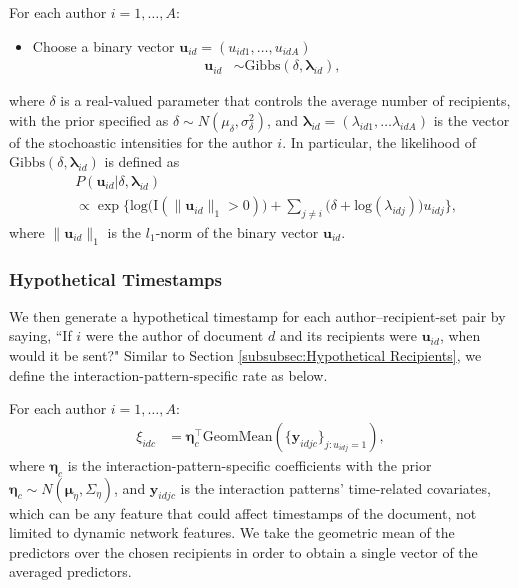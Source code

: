 \documentclass[twoside]{article}
\begin{document}
For each author $i =1,\ldots,A$:
\begin{itemize}
	\item Choose a binary vector $\boldsymbol{u}_{id}= (u_{id1},
	\ldots, u_{idA})$
\begin{align*} \boldsymbol{u}_{id} & \sim
\mbox{Gibbs}(\delta, \boldsymbol{\lambda}_{id}),
\end{align*}
\end{itemize}
	where $\delta$ is a real-valued parameter that controls the average number of recipients, with the prior specified as $\delta \sim N(\mu_\delta,\sigma^2_\delta)$, and $\boldsymbol{\lambda}_{id}=(\lambda_{id1},\ldots\lambda_{idA})$ is the vector of the stochoastic intensities for the author $i$. In particular, the likelihood of $\mbox{Gibbs}(\delta, \boldsymbol{\lambda}_{id})$ is defined as
	\begin{align*}
	&P(\boldsymbol{u}_{id}|\delta, \boldsymbol{\lambda}_{id}) \\&\propto \exp\Big\{\mbox{log}\Big(\text{I}( \lVert \boldsymbol{u}_{id}\rVert_1 > 0 )\Big) + \sum_{j \neq i} \Big(\delta+\mbox{log}(\lambda_{idj})\Big)u_{idj}\Big\},
	\end{align*}
where $\lVert \boldsymbol{u}_{id}\rVert_1$ is the $l_1$-norm of the binary vector $\boldsymbol{u}_{id}$.

\subsubsection{Hypothetical Timestamps}\label{subsubsec:Hypothetical Timestamps}
We then generate a hypothetical timestamp for each author--recipient-set pair by saying, ``If $i$ were the author of document $d$ and its recipients were $\boldsymbol{u}_{id}$, when would it be sent?" Similar to Section \ref{subsubsec:Hypothetical Recipients}, we define the interaction-pattern-specific rate as below.

For each author $i =1,\ldots,A$:
\begin{align*}
\xi_{idc}& = \boldsymbol{\eta}_c^\top\mbox{GeomMean}(\{ \boldsymbol{y}_{idjc}\}_{j:u_{idj}= 1}),
\end{align*}
where $\boldsymbol{\eta}_c$ is the interaction-pattern-specific coefficients with the prior $\boldsymbol{\eta}_c \sim N(\boldsymbol{\mu}_\eta,\Sigma_\eta)$, and $\boldsymbol{y}_{idjc}$ is the interaction patterns' time-related covariates, which can be any feature that could affect timestamps of the document, not limited to dynamic network features. We take the geometric mean of the predictors over the chosen recipients in order to obtain a single vector of the averaged predictors. 
\end{document}
